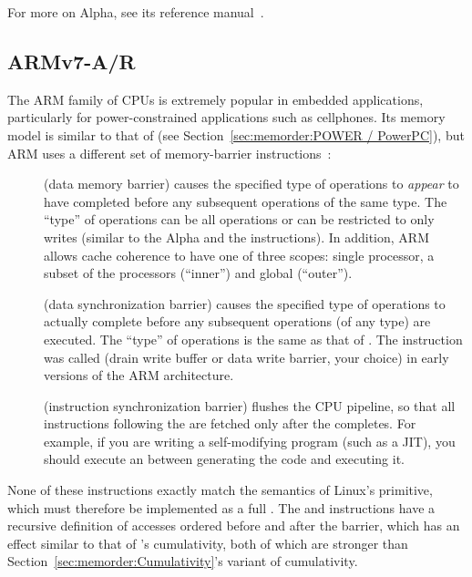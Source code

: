 For more on Alpha, see its reference manual~\cite{ALPHA2002}.

\subsection{ARMv7-A/R}
\label{sec:memorder:ARMv7-A/R}

The ARM family of CPUs is extremely popular in embedded applications,
particularly for power-constrained applications such as cellphones.
Its memory model is similar to that of \Power{}
(see Section~\ref{sec:memorder:POWER / PowerPC}), but ARM uses a
different set of memory-barrier instructions~\cite{ARMv7A:2010}:

\begin{description}
\item	[] (data memory barrier) causes the specified type of
	operations to \emph{appear} to have completed before any
	subsequent operations of the same type.
	The ``type'' of operations can be all operations or can be
	restricted to only writes (similar to the Alpha 
	and the \Power{}  instructions).
	In addition, ARM allows cache coherence to have one of three
	scopes: single processor, a subset of the processors
	(``inner'') and global (``outer'').
\item	[] (data synchronization barrier) causes the specified
	type of operations to actually complete before any subsequent
	operations (of any type) are executed.
	The ``type'' of operations is the same as that of .
	The  instruction was called  (drain write buffer
	or data write barrier, your choice) in early versions of the
	ARM architecture.
\item	[] (instruction synchronization barrier) flushes the CPU
	pipeline, so that all instructions following the 
	are fetched only after the  completes.
	For example, if you are writing a self-modifying program
	(such as a JIT), you should execute an  between
	generating the code and executing it.
\end{description}

None of these instructions exactly match the semantics of Linux's
 primitive, which must therefore be implemented as a full
.
The  and  instructions have a recursive definition
of accesses ordered before and after the barrier, which has an effect
similar to that of \Power{}'s cumulativity, both of which are
stronger than
Section~\ref{sec:memorder:Cumulativity}'s
variant of cumulativity.

